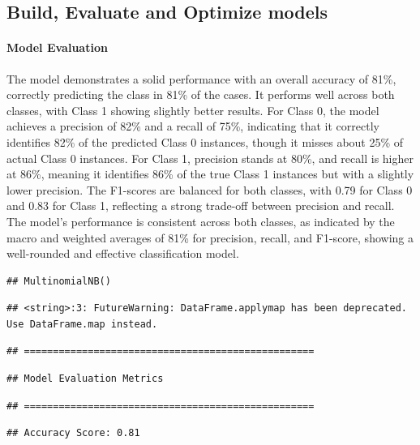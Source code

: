\documentclass[preprint, 3p,
authoryear]{elsarticle} %
\begin{document}
\subsection{Build, Evaluate and Optimize
models}\label{build-evaluate-and-optimize-models}

\paragraph{Model Evaluation}\label{model-evaluation}

The model demonstrates a solid performance with an overall accuracy of
81\%, correctly predicting the class in 81\% of the cases. It performs
well across both classes, with Class 1 showing slightly better results.
For Class 0, the model achieves a precision of 82\% and a recall of
75\%, indicating that it correctly identifies 82\% of the predicted
Class 0 instances, though it misses about 25\% of actual Class 0
instances. For Class 1, precision stands at 80\%, and recall is higher
at 86\%, meaning it identifies 86\% of the true Class 1 instances but
with a slightly lower precision. The F1-scores are balanced for both
classes, with 0.79 for Class 0 and 0.83 for Class 1, reflecting a strong
trade-off between precision and recall. The model's performance is
consistent across both classes, as indicated by the macro and weighted
averages of 81\% for precision, recall, and F1-score, showing a
well-rounded and effective classification model.

\begin{verbatim}
## MultinomialNB()
\end{verbatim}

\begin{verbatim}
## <string>:3: FutureWarning: DataFrame.applymap has been deprecated. Use DataFrame.map instead.
\end{verbatim}

\begin{verbatim}
## ==================================================
\end{verbatim}

\begin{verbatim}
## Model Evaluation Metrics
\end{verbatim}

\begin{verbatim}
## ==================================================
\end{verbatim}

\begin{verbatim}
## Accuracy Score: 0.81
\end{verbatim}
\end{document}
